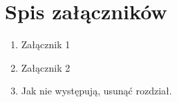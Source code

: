 \documentclass[a4paper,11pt,twoside]{report}
\theoremstyle{definition}
\begin{document}
\thispagestyle{empty}






\listoffigures
\thispagestyle{empty}


\renewcommand{\listtablename}{Spis tabel}
\listoftables
\thispagestyle{empty}



\chapter*{Spis załączników}
\begin{enumerate}
\item Załącznik 1
\item Załącznik 2
\item Jak nie występują, usunąć rozdział.
\end{enumerate}
\thispagestyle{empty}
\end{document}
